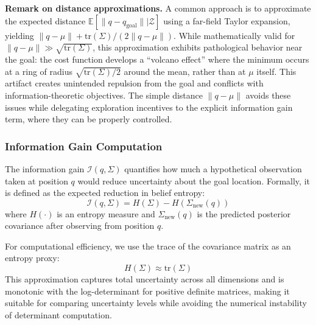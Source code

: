 \textbf{Remark on distance approximations.} A common approach is to approximate the expected distance $\mathbb{E}[\|q - q_{\text{goal}}\| | \mathcal{Z}]$ using a far-field Taylor expansion, yielding $\|q - \mu\| + \text{tr}(\Sigma)/(2\|q - \mu\|)$. While mathematically valid for $\|q - \mu\| \gg \sqrt{\text{tr}(\Sigma)}$, this approximation exhibits pathological behavior near the goal: the cost function develops a ``volcano effect'' where the minimum occurs at a ring of radius $\sqrt{\text{tr}(\Sigma)/2}$ around the mean, rather than at $\mu$ itself. This artifact creates unintended repulsion from the goal and conflicts with information-theoretic objectives. The simple distance $\|q - \mu\|$ avoids these issues while delegating exploration incentives to the explicit information gain term, where they can be properly controlled.

\subsubsection{Information Gain Computation}

The information gain $\mathcal{I}(q, \Sigma)$ quantifies how much a hypothetical observation taken at position $q$ would reduce uncertainty about the goal location. Formally, it is defined as the expected reduction in belief entropy:
\begin{equation}
    \mathcal{I}(q, \Sigma) = H(\Sigma) - H(\Sigma_{\text{new}}(q))
\end{equation}
where $H(\cdot)$ is an entropy measure and $\Sigma_{\text{new}}(q)$ is the predicted posterior covariance after observing from position $q$.

For computational efficiency, we use the trace of the covariance matrix as an entropy proxy:
\begin{equation}
    H(\Sigma) \approx \text{tr}(\Sigma)
\end{equation}
This approximation captures total uncertainty across all dimensions and is monotonic with the log-determinant for positive definite matrices, making it suitable for comparing uncertainty levels while avoiding the numerical instability of determinant computation.

